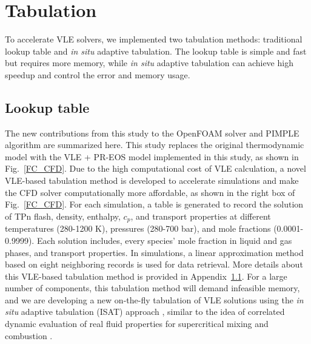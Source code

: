 \chapter{Tabulation}
\label{tabulation_chapter}
To accelerate VLE solvers, we implemented two tabulation methods: traditional lookup table and \textit{in situ} adaptive tabulation. The lookup table is simple and fast but requires more memory, while \textit{in situ} adaptive tabulation can achieve high speedup and control the error and memory usage.

\section{Lookup table} \label{App:tab} %
The new contributions from this study to the OpenFOAM solver and PIMPLE algorithm are summarized here. This study replaces the original thermodynamic model with the VLE + PR-EOS model implemented in this study, as shown in Fig.~\ref{FC_CFD}. Due to the high computational cost of VLE calculation, a novel VLE-based tabulation method is developed to accelerate simulations and make the CFD solver computationally more affordable, as shown in the right box of Fig.~\ref{FC_CFD}. For each simulation, a table is generated to record the solution of TPn flash, density, enthalpy, $c_p$, and transport properties at different temperatures (280-1200 K), pressures (280-700 bar), and  mole fractions (0.0001-0.9999). Each solution includes, every species' mole fraction in liquid and gas phases, and transport properties. In simulations, a linear approximation method based on eight neighboring records is used for data retrieval. More details about this VLE-based tabulation method is provided in Appendix~\ref{App:tab}. For a large number of components, this tabulation method will demand infeasible memory, and we are developing a new on-the-fly tabulation of VLE solutions using the \textit{in situ} adaptive tabulation (ISAT) approach \cite{zhang2021multi}, similar to the idea of correlated dynamic evaluation of real fluid properties for supercritical mixing \cite{yang2017comparison} and combustion \cite{milan2019time}.    


